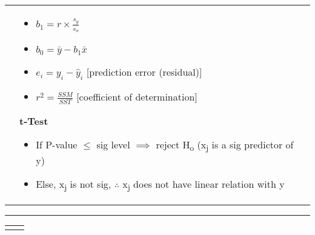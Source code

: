 \documentclass[6pt]{article}
\newcommand{\HL}{\par\noindent\rule{\textwidth}{0.4pt}}
\begin{document}
\begin{footnotesize}
\begin{tabular}{l | l}
{}

&

\parbox{0.5\textwidth}{
\begin{flushright}
\begin{itemize}

\item $b_{1} = r \times \frac{s_{y}}{s_{x}}$
\item $b_{0} = \bar{y} - b_{1}\bar{x}$
\item $e_{i} = y_{i} - \hat{y}_{i}$ [prediction error (residual)]
\item $r^{2} = \frac{SSM}{SST}$ [coefficient of determination]


\end{itemize}

\begin{flushleft}
\textbf{t-Test}
\end{flushleft}
\begin{itemize}
\item If P-value $\le$ sig level $\implies$ reject H\textsubscript{o} (x\textsubscript{j} is a sig predictor of y)
\item Else, x\textsubscript{j} is not sig, $\therefore$ x\textsubscript{j} does not have linear relation with y
\end{itemize}
\end{flushright}
}

\end{tabular}

\HL


\begin{tabular}{l | l}

\parbox{0.625\textwidth}{

}
\end{tabular}
\end{footnotesize}
\end{document}
